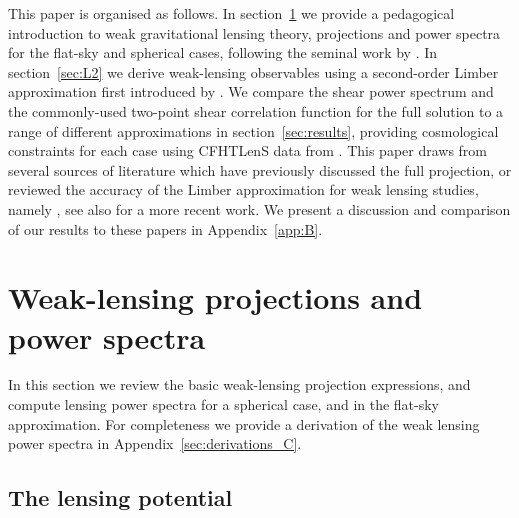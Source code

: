 \documentclass[fleqn,usenatbib]{mnras} %
\begin{document}
This paper is organised as follows.  In section~\ref{sec:wl} we provide a
pedagogical introduction to weak gravitational lensing theory, projections and
power spectra for the flat-sky and spherical cases, following the seminal work
by \citet{2000PhRvD..62d3007H} \cite[see also][]{2005PhRvD..72b3516C}. In
section~\ref{sec:L2} we derive weak-lensing observables using a second-order
Limber approximation first introduced by \citet{2008PhRvD..78l3506L}. We
compare the shear power spectrum and the commonly-used two-point shear
correlation function for the full solution to a range of different
approximations in section~\ref{sec:results}, providing cosmological constraints
for each case using CFHTLenS data from \citet{CFHTLenS-2pt-notomo}. This paper
draws from several sources of literature which have previously discussed the
full projection, or reviewed the accuracy of the Limber approximation for weak
lensing studies, namely \citet{2008PhRvD..78d3002S,2012PhRvD..86b3001B,
2012MNRAS.422.2854G, 2016arXiv161104954K}, see also
\cite{2017arXiv170401054L} for a more recent work. We present a discussion and
comparison of our results to these papers in Appendix~\ref{app:B}.


\section{Weak-lensing projections and power spectra}
\label{sec:wl}

In this section we review the basic weak-lensing projection expressions, and
compute lensing power spectra for a spherical case, and in the flat-sky
approximation. For completeness we provide a derivation of the weak lensing
power spectra in Appendix~\ref{sec:derivations_C}.

\subsection{The lensing potential}
\label{sec:psi}
\end{document}

